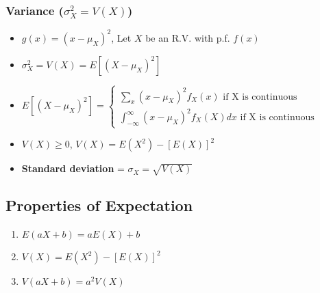 \documentclass[10pt]{article}
\begin{document}
\subsubsection*{Variance ($\sigma_X^2 = V(X)$)}
\begin{itemize}
    \item $g(x) = (x - \mu^{}_{X})^2$, Let $X$ be an R.V. with p.f. $f(x)$
    \item $\sigma_X^2 = V(X) = E[(X-\mu^{}_X)^2]$
    \item $E[(X-\mu^{}_X)^2] = \begin{cases}
                  \sum_{x}^{} (x - \mu^{}_X)^2 f_X^{}(x) \text{ if X is continuous} \\
                  \int_{-\infty}^{\infty}(x-\mu_X^{})^2 f_X^{}(X) dx \text{ if X is continuous}
              \end{cases}$
    \item $V(X) \geq 0$, $V(X) = E(X^2) - [E(X)]^2$
    \item \textbf{Standard deviation} = $\sigma_X^{} = \sqrt{V(X)}$
\end{itemize}
\subsection*{Properties of Expectation}
\begin{enumerate}
    \item $E(aX+b) = aE(X) + b$
    \item $V(X) = E(X^2) - [E(X)]^2$
    \item $V(aX+b)=a^2V(X)$
\end{enumerate}
\end{document}
